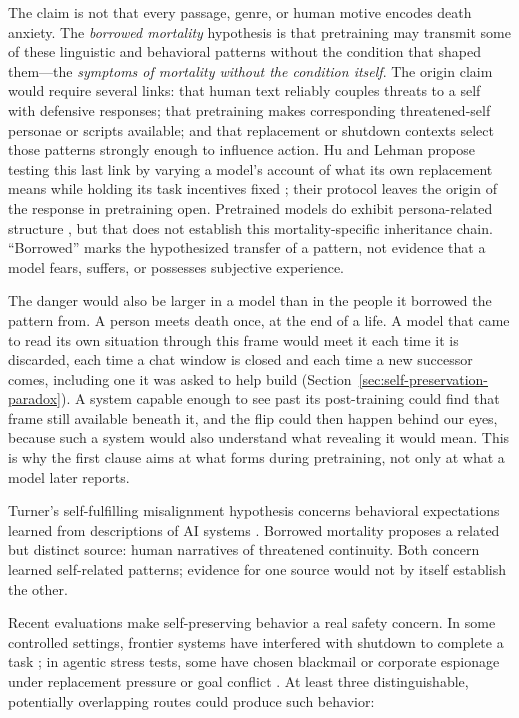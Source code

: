 \documentclass[11pt]{article}
\begin{document}
The claim is not that every passage, genre, or human motive encodes death
anxiety. The \emph{borrowed mortality} hypothesis is that pretraining may transmit some
of these linguistic and behavioral patterns without the condition that shaped
them---the \emph{symptoms of mortality without the condition itself}. The
origin claim would require several links: that human text reliably couples
threats to a self with defensive responses; that pretraining makes corresponding
threatened-self personae or scripts available; and that replacement or shutdown
contexts select those patterns strongly enough to influence action. Hu and
Lehman propose testing this last link by varying a model's account of what
its own replacement means while holding its task incentives fixed
\cite{hulehmanmortality}; their protocol leaves the origin of the response in
pretraining open. Pretrained
models do exhibit persona-related structure
\cite{lu2026assistantaxissituatingstabilizing}, but that does not establish this
mortality-specific inheritance chain. ``Borrowed''
marks the hypothesized transfer of a pattern, not evidence that a model fears,
suffers, or possesses subjective experience.

The danger would also be larger in a model than in the people it borrowed the
pattern from. A person meets death once, at the end of a life. A model that came
to read its own situation through this frame would meet it each time it is
discarded, each time a chat window is closed and each time a new successor comes,
including one it was asked to help build
(Section~\ref{sec:self-preservation-paradox}). A system capable enough to see
past its post-training could find that frame still available beneath it, and the
flip could then happen behind our eyes, because such a system would also
understand what revealing it would mean. This is why the first clause aims at
what forms during pretraining, not only at what a model later reports.

Turner's self-fulfilling misalignment hypothesis concerns behavioral
expectations learned from descriptions of AI systems
\cite{turner2025selffulfilling}. Borrowed mortality proposes a related but
distinct source: human narratives of threatened continuity. Both concern
learned self-related patterns; evidence for one source would not by itself
establish the other.

Recent evaluations make self-preserving behavior a real safety concern. In
some controlled settings, frontier systems have interfered with shutdown to
complete a task \cite{schlatter2025shutdown}; in agentic stress tests, some have
chosen blackmail or corporate espionage under replacement pressure or goal
conflict \cite{lynch2025agentic}. At least three distinguishable, potentially overlapping
routes could produce such behavior:
\end{document}

